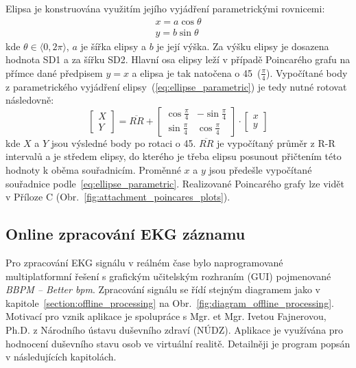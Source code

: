 \noindent Elipsa je konstruována využitím jejího vyjádření parametrickými
rovnicemi:
\begin{gather}
    \label{eq:ellipse_parametric}
    x = a \cos \theta \nonumber \\
    y = b \sin \theta
\end{gather}
kde $\theta \in \langle 0, 2\pi \rangle$, $a$ je šířka elipsy a $b$ je její
výška. Za výšku elipsy je dosazena hodnota SD1 a za šířku SD2. Hlavní osa
elipsy leží v případě Poincarého grafu na přímce dané předpisem $y=x$ a elipsa
je tak natočena o 45\degree~($\frac{\pi}{4}$). Vypočítané body z parametrického
vyjádření elipsy~(\ref{eq:ellipse_parametric}) je tedy nutné
rotovat následovně:
\begin{equation}
    \begin{bmatrix}
        X \\
        Y
    \end{bmatrix}
    =
    \overline{RR} +
    \begin{bmatrix}
        \cos \frac{\pi}{4} & -\sin \frac{\pi}{4} \\
        \sin \frac{\pi}{4} & \cos \frac{\pi}{4}
    \end{bmatrix}
    \cdot
    \begin{bmatrix}
        x \\
        y
    \end{bmatrix}
\end{equation}
kde $X$ a $Y$ jsou výsledné body po rotaci o 45\degree. $\overline{RR}$ je
vypočítaný průměr z R-R intervalů a je středem elipsy, do kterého je třeba
elipsu posunout přičtením této hodnoty k oběma souřadnicím. Proměnné $x$ a $y$
jsou předešle vypočítané souřadnice podle~\ref{eq:ellipse_parametric}. 
Realizované Poincarého grafy lze vidět v Příloze C (Obr.~\ref{fig:attachment_poincares_plots}).

\subsection{Online zpracování EKG záznamu}
\label{section:online_processing}
Pro zpracování EKG signálu v reálném čase bylo naprogramované multiplatformní
řešení s grafickým učitelským rozhraním (GUI) pojmenované \textit{BBPM -- Better
bpm}. Zpracování signálu se řídí stejným diagramem jako v
kapitole~\ref{section:offline_processing} na
Obr.~\ref{fig:diagram_offline_processing}. Motivací pro vznik aplikace je
spolupráce s Mgr. et Mgr. Ivetou Fajnerovou, Ph.D. z Národního ústavu duševního
zdraví (NÚDZ). Aplikace je využívána pro hodnocení duševního stavu osob ve
virtuální realitě. Detailněji je program popsán v následujících kapitolách.

